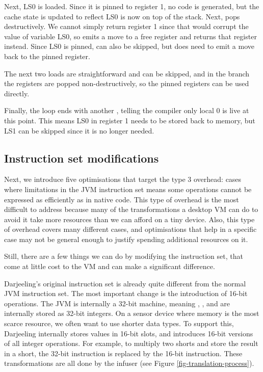 Next, LS0 is loaded. Since it is pinned to register 1, no code is generated, but the cache state is updated to reflect LS0 is now on top of the stack. Next,  pops destructively. We cannot simply return register 1 since that would corrupt the value of variable LS0, so  emits a move to a free register and returns that register instead. Since LS0 is pinned,  can also be skipped, but  does need to emit a move back to the pinned register.

The next two loads are straightforward and can be skipped, and in the branch the registers are popped non-destructively, so the pinned registers can be used directly.

Finally, the loop ends with another , telling the compiler only local 0 is live at this point. This means LS0 in register 1 needs to be stored back to memory, but LS1 can be skipped since it is no longer needed.

\subsection{Instruction set modifications}
Next, we introduce five optimisations that target the type 3 overhead: cases where limitations in the JVM instruction set means some operations cannot be expressed as efficiently as in native code. This type of overhead is the most difficult to address because many of the transformations a desktop VM can do to avoid it take more resources than we can afford on a tiny device. Also, this type of overhead covers many different cases, and optimisations that help in a specific case may not be general enough to justify spending additional resources on it.

Still, there are a few things we can do by modifying the instruction set, that come at little cost to the VM and can make a significant difference.

Darjeeling's original instruction set is already quite different from the normal JVM instruction set. The most important change is the introduction of 16-bit operations. The JVM is internally a 32-bit machine, meaning , , and  are internally stored as 32-bit integers. On a sensor device where memory is the most scarce resource, we often want to use shorter data types. To support this, Darjeeling internally stores values in 16-bit slots, and introduces 16-bit versions of all integer operations. For example, to multiply two shorts and store the result in a short, the 32-bit  instruction is replaced by the 16-bit  instruction. These transformations are all done by the infuser (see Figure \ref{fig-translation-process}).

